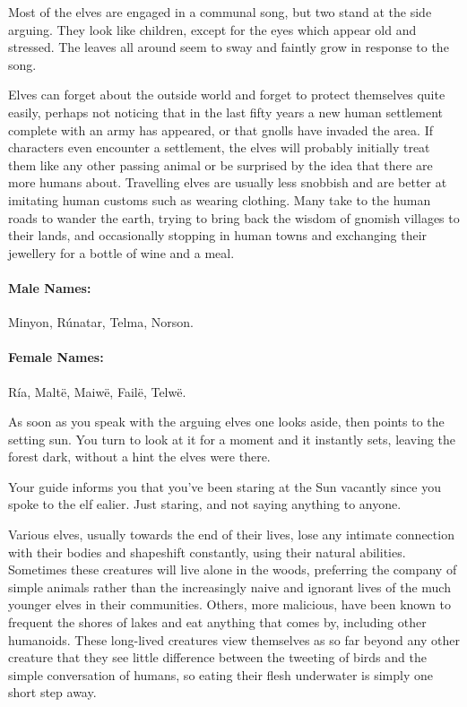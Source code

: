 \begin{multicols}{2}
\begin{boxtext}

	Most of the elves are engaged in a communal song, but two stand at the side arguing.
	They look like children, except for the eyes which appear old and stressed.
	The leaves all around seem to sway and faintly grow in response to the song.

\end{boxtext}

Elves can forget about the outside world and forget to protect themselves quite easily, perhaps not noticing that in the last fifty years a new human settlement complete with an army has appeared, or that gnolls have invaded the area.
If characters even encounter a settlement, the elves will probably initially treat them like any other passing animal or be surprised by the idea that there are more humans about.
Travelling elves are usually less snobbish and are better at imitating human customs such as wearing clothing.
Many take to the human roads to wander the earth, trying to bring back the wisdom of gnomish villages to their lands, and occasionally stopping in human towns and exchanging their jewellery for a bottle of wine and a meal.

\paragraph{Male Names:} Minyon, R\'{u}natar, Telma, Norson.
\paragraph{Female Names:} R\'{i}a, Malt\"{e}, Maiw\"{e}, Fail\"{e}, Telw\"{e}.

\begin{boxtext}

	As soon as you speak with the arguing elves one looks aside, then points to the setting sun.
	You turn to look at it for a moment and it instantly sets, leaving the forest dark, without a hint the elves were there.

	Your guide informs you that you've been staring at the Sun vacantly since you spoke to the elf ealier.
	Just staring, and not saying anything to anyone.

\end{boxtext}

\label{dryad}

Various elves, usually towards the end of their lives, lose any intimate connection with their bodies and shapeshift constantly, using their natural abilities.  Sometimes these creatures will live alone in the woods, preferring the company of simple animals rather than the increasingly naive and ignorant lives of the much younger elves in their communities.  Others, more malicious, have been known to frequent the shores of lakes and eat anything that comes by, including other humanoids.  These long-lived creatures view themselves as so far beyond any other creature that they see little difference between the tweeting of birds and the simple conversation of humans, so eating their flesh underwater is simply one short step away.


\end{multicols}
